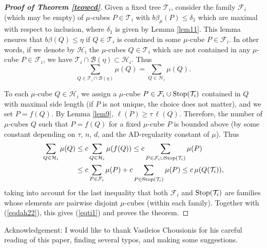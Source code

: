 \documentclass[11pt]{amsart}
\newcommand{\FF}{{\mathcal F}}
\newcommand{\HH}{{\mathcal H}}
\newcommand{\BZ}{{\mathcal B}}
\newcommand{\TT}{{\mathcal T}}
\newcommand{\rf}[1]{{(\ref{#1})}}
\newcommand{\vv}{{\vspace{2mm}}}
\newcommand{\vvv}{\vspace{4mm}}
\newcommand{\sss}{{\rm Stop}}
\theoremstyle{definition}
\theoremstyle{remark}
\numberwithin{equation}{section}
\begin{document}
\begin{proof}[\bf Proof of Theorem \ref{teowcd}]
Given a fixed tree $\TT_i$, consider the family $\FF_i$ (which may be empty) of $\mu$-cubes $P\in\TT_i$ with $b\beta_\mu(P)\leq
\delta_1$  which are maximal with respect to inclusion, where $\delta_1$ is given by Lemma \ref{lem11}.
This lemma ensures that $b\beta(Q)\leq \eta$ if $Q\in\TT_i$ is contained in some $\mu$-cube $P\in\FF_i$.
In other words, if we denote by $\HH_i$ the
$\mu$-cubes $Q\in\TT_i$ which are not contained in any $\mu$-cube $P\in\FF_i$, we have
$\TT_i\cap \BZ(\eta)\subset\HH_i$. Thus
\begin{equation}\label{eqdah22}
\sum_{Q\in \TT_i\cap \BZ(\eta)} \mu(Q) = \sum_{Q\in \HH_i} \mu(Q).
\end{equation}

To each $\mu$-cube $Q\in \HH_i$ we assign a $\mu$-cube $P\in\FF_i\cup\sss(\TT_i)$ contained in $Q$ with maximal side length
(if $P$ is not unique, the choice does not matter), and we set $P=f(Q)$. By Lemma \ref{lem9},
$\ell(P)\geq\tau\,\ell(Q)$.
Therefore, the number of $\mu$-cubes $Q$ such that $P=f(Q)$ for a fixed $\mu$-cube $P$ is bounded above (by some constant depending on $\tau$, $n$, $d$, and the AD-regularity constant of $\mu$). Thus
\begin{align*}
\sum_{Q\in \HH_i} \mu(Q) & \leq c\sum_{Q\in \HH_i} \mu(f(Q)) \leq c\sum_{P\in \FF_i\cup
\sss(\TT_i)} \mu(P)\\
&\leq c\sum_{P\in \FF_i} \mu(P) + c\sum_{P\in \sss(\TT_i)} \mu(P)\leq c\,\mu(Q(\TT_i)),
\end{align*}
taking into account for the last inequality that both $\FF_i$ and $\sss(\TT_i)$ are families whose elements are pairwise
disjoint $\mu$-cubes (within each family). Together with \rf{eqdah22}, this gives \rf{eqti1} and proves 
the theorem.
\end{proof}

\vvv
\vv

Acknowledgement: I would like to thank Vasileios Chousionis for his careful reading of this paper, finding several typos, and making some suggestions.
\vvv
\end{document}

